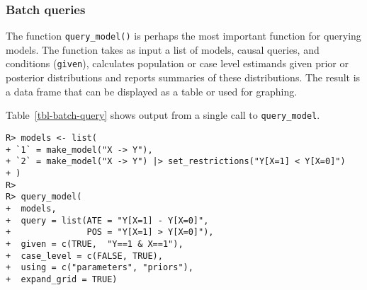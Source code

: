 \documentclass[
  11pt,
  article]{jss}
\begin{document}
\hypertarget{batch-queries}{%
\subsubsection{Batch queries}\label{batch-queries}}

The function \texttt{query\_model()} is perhaps the most important
function for querying models. The function takes as input a list of
models, causal queries, and conditions (\texttt{given}), calculates
population or case level estimands given prior or posterior
distributions and reports summaries of these distributions. The result
is a data frame that can be displayed as a table or used for graphing.

Table~\ref{tbl-batch-query} shows output from a single call to
\texttt{query\_model}.

\begin{verbatim}
R> models <- list(
+ `1` = make_model("X -> Y"),
+ `2` = make_model("X -> Y") |> set_restrictions("Y[X=1] < Y[X=0]")
+ )
R> 
R> query_model(
+  models,
+  query = list(ATE = "Y[X=1] - Y[X=0]", 
+               POS = "Y[X=1] > Y[X=0]"),
+  given = c(TRUE,  "Y==1 & X==1"),
+  case_level = c(FALSE, TRUE),
+  using = c("parameters", "priors"),
+  expand_grid = TRUE)
\end{verbatim}
\end{document}
